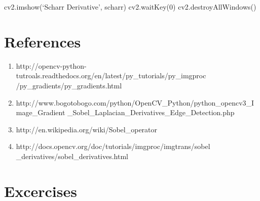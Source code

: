 \documentclass[]{article}
\newenvironment{Shaded}{}{}
\newcommand{\DecValTok}[1]{\textcolor[rgb]{0.25,0.63,0.44}{{#1}}}
\newcommand{\NormalTok}[1]{{#1}}
\begin{document}
\begin{itemize}
\begin{Shaded}
\begin{Highlighting}[]
\NormalTok{cv2.imshow(‘Scharr Derivative’, scharr)}
\NormalTok{cv2.waitKey(}\DecValTok{0}\NormalTok{)}
\NormalTok{cv2.destroyAllWindows()}
\end{Highlighting}
\end{Shaded}
\end{itemize}

\section{References}\label{references}

\begin{enumerate}
\def\labelenumi{\arabic{enumi}.}
\item
  http://opencv-python-tutroals.readthedocs.org/en/latest/py\_tutorials/py\_imgproc
  /py\_gradients/py\_gradients.html
\item
  http://www.bogotobogo.com/python/OpenCV\_Python/python\_opencv3\_Image\_Gradient
  \_Sobel\_Laplacian\_Derivatives\_Edge\_Detection.php
\item
  http://en.wikipedia.org/wiki/Sobel\_operator
\item
  http://docs.opencv.org/doc/tutorials/imgproc/imgtrans/sobel
  \_derivatives/sobel\_derivatives.html
\end{enumerate}

\section{Excercises}\label{excercises}
\end{document}
